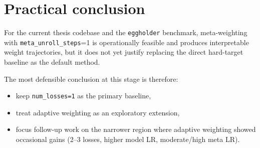 \section{Practical conclusion}

For the current thesis codebase and the \texttt{eggholder} benchmark,
meta-weighting with \texttt{meta\_unroll\_steps}=1 is operationally feasible and
produces interpretable weight trajectories, but it does not yet justify
replacing the direct hard-target baseline as the default method.

The most defensible conclusion at this stage is therefore:
\begin{itemize}
    \item keep \texttt{num\_losses=1} as the primary baseline,
    \item treat adaptive weighting as an exploratory extension,
    \item focus follow-up work on the narrower region where adaptive weighting
          showed occasional gains (2--3 losses, higher model LR, moderate/high
          meta LR).
\end{itemize}
